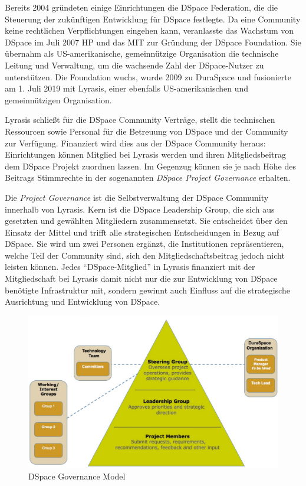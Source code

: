 \documentclass[a4paper,
fontsize=11pt,
oneside,
numbers=noperiodatend,
parskip=half-,
bibliography=totoc,
final
]{scrartcl}
\begin{document}
Bereits 2004 gründeten einige Einrichtungen die DSpace Federation, die
die Steuerung der zukünftigen Entwicklung für DSpace festlegte. Da eine
Community keine rechtlichen Verpflichtungen eingehen kann, veranlasste
das Wachstum von DSpace im Juli 2007 HP und das MIT zur Gründung der
DSpace Foundation. Sie übernahm als US-amerikanische, gemeinnützige
Organisation die technische Leitung und Verwaltung, um die wachsende
Zahl der DSpace-Nutzer zu unterstützen. Die Foundation wuchs, wurde 2009
zu DuraSpace und fusionierte am 1. Juli 2019 mit Lyrasis, einer
ebenfalls US-amerikanischen und gemeinnützigen Organisation.

Lyrasis schließt für die DSpace Community Verträge, stellt die
technischen Ressourcen sowie Personal für die Betreuung von DSpace und
der Community zur Verfügung. Finanziert wird dies aus der DSpace
Community heraus: Einrichtungen können Mitglied bei Lyrasis werden und
ihren Mitgliedsbeitrag dem DSpace Projekt zuordnen lassen. Im Gegenzug
können sie je nach Höhe des Beitrags Stimmrechte in der sogenannten
\emph{DSpace Project Governance} erhalten.

Die \emph{Project Governance} ist die Selbstverwaltung der DSpace
Community innerhalb von Lyrasis. Kern ist die DSpace Leadership Group,
die sich aus gesetzten und gewählten Mitgliedern zusammensetzt. Sie
entscheidet über den Einsatz der Mittel und trifft alle strategischen
Entscheidungen in Bezug auf DSpace. Sie wird um zwei Personen ergänzt,
die Institutionen repräsentieren, welche Teil der Community sind, sich
den Mitgliedschaftsbeitrag jedoch nicht leisten können. Jedes
\enquote{DSpace-Mitglied} in Lyrasis finanziert mit der Mitgliedschaft
bei Lyrasis damit nicht nur die zur Entwicklung von DSpace benötigte
Infrastruktur mit, sondern gewinnt auch Einfluss auf die strategische
Ausrichtung und Entwicklung von DSpace.

\begin{figure}
\centering
\includegraphics[width=.6\textwidth]{img/DSpace_Project_Governance.png}
\caption{DSpace Governance Model}
\end{figure}
\end{document}
